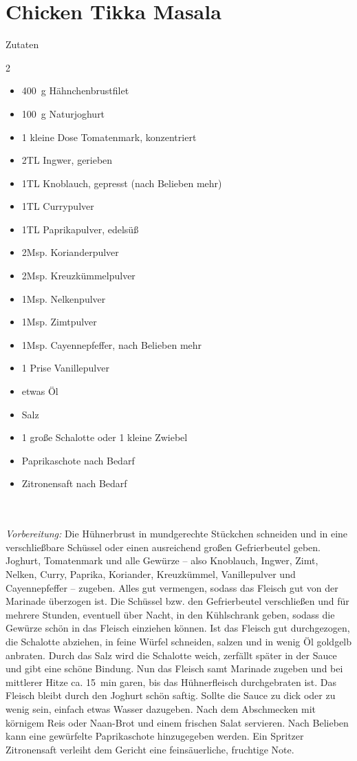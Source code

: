 \section*{Chicken Tikka Masala}
\ihead{}\ohead{}
\cfoot{}
{\Large Zutaten}
\begin{multicols}{2}
\begin{itemize}
\item \SI{400}{g} Hähnchenbrustfilet
\item \SI{100}{g} Naturjoghurt
\item \num{1} kleine Dose Tomatenmark, konzentriert
\item \num{2}{TL} Ingwer, gerieben
\item \num{1}{TL} Knoblauch, gepresst (nach Belieben mehr)
\item \num{1}{TL} Currypulver
\item \num{1}{TL} Paprikapulver, edelsüß
\item \num{2}{Msp.} Korianderpulver
\item \num{2}{Msp.} Kreuzkümmelpulver
\item \num{1}{Msp.} Nelkenpulver
\item \num{1}{Msp.} Zimtpulver
\item \num{1}{Msp.} Cayennepfeffer, nach Belieben mehr
\item \num{1} Prise Vanillepulver
\item etwas Öl
\item Salz
\item \num{1} große Schalotte oder \num{1} kleine Zwiebel
\item Paprikaschote nach Bedarf
\item Zitronensaft nach Bedarf
\end{itemize}
\end{multicols}
\\
\\
\textit{Vorbereitung:} Die Hühnerbrust in mundgerechte Stückchen schneiden und in eine verschließbare Schüssel oder einen ausreichend großen Gefrierbeutel geben.
Joghurt, Tomatenmark und alle Gewürze – also Knoblauch, Ingwer, Zimt, Nelken, Curry, Paprika, Koriander, Kreuzkümmel, Vanillepulver und Cayennepfeffer – zugeben.
Alles gut vermengen, sodass das Fleisch gut von der Marinade überzogen ist.
Die Schüssel bzw. den Gefrierbeutel verschließen und für mehrere Stunden, eventuell über Nacht, in den Kühlschrank geben, sodass die Gewürze schön in das Fleisch einziehen können.
Ist das Fleisch gut durchgezogen, die Schalotte abziehen, in feine Würfel schneiden, salzen und in wenig Öl goldgelb anbraten.
Durch das Salz wird die Schalotte weich, zerfällt später in der Sauce und gibt eine schöne Bindung.
Nun das Fleisch samt Marinade zugeben und bei mittlerer Hitze ca. \SI{15}{min} garen, bis das Hühnerfleisch durchgebraten ist.
Das Fleisch bleibt durch den Joghurt schön saftig.
Sollte die Sauce zu dick oder zu wenig sein, einfach etwas Wasser dazugeben.
Nach dem Abschmecken mit körnigem Reis oder Naan-Brot und einem frischen Salat servieren.
Nach Belieben kann eine gewürfelte Paprikaschote hinzugegeben werden.
Ein Spritzer Zitronensaft verleiht dem Gericht eine feinsäuerliche, fruchtige Note.
